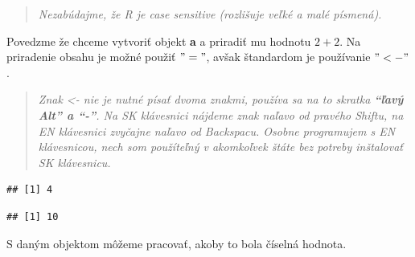 \begin{quote}
\emph{Nezabúdajme, že R je case sensitive (rozlišuje veľké a malé
písmená).}
\end{quote}

Povedzme že chceme vytvoriť objekt \textbf{a} a priradiť mu hodnotu
\(2 + 2\). Na priradenie obsahu je možné použiť \("="\), avšak
štandardom je používanie \("<-"\).

\begin{quote}
\emph{Znak \textless- nie je nutné písať dvoma znakmi, používa sa na to
skratka \textbf{``ľavý Alt'' a ``-''}. Na SK klávesnici nájdeme znak
naľavo od pravého Shiftu, na EN klávesnici zvyčajne naľavo od Backspacu.
Osobne programujem s EN klávesnicou, nech som použíteľný v akomkoľvek
štáte bez potreby inštalovať SK klávesnicu.}
\end{quote}

\begin{Shaded}
\begin{Highlighting}[]

\StringTok{ } \OperatorTok{+}\StringTok{ }


\end{Highlighting}
\end{Shaded}

\begin{verbatim}
## [1] 4
\end{verbatim}

\begin{Shaded}
\begin{Highlighting}[]

\StringTok{ } \OperatorTok{+}\StringTok{ }

\end{Highlighting}
\end{Shaded}

\begin{verbatim}
## [1] 10
\end{verbatim}

S daným objektom môžeme pracovať, akoby to bola číselná hodnota.

\begin{Shaded}
\begin{Highlighting}[]
\OperatorTok{^}
\end{Highlighting}
\end{Shaded}

